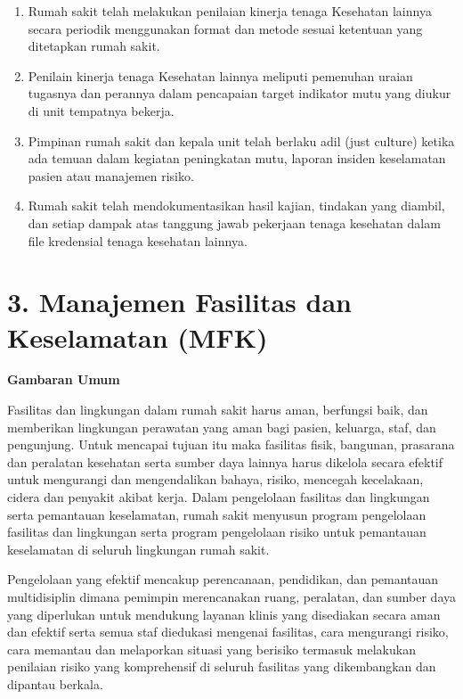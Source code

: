\documentclass[
]{book}
\providecommand{\tightlist}{%
  \setlength{\itemsep}{0pt}\setlength{\parskip}{0pt}}
\begin{document}
\begin{enumerate}
\def\labelenumi{\alph{enumi}.}
\tightlist
\item
  Rumah sakit telah melakukan penilaian kinerja tenaga Kesehatan lainnya secara periodik menggunakan format dan metode sesuai ketentuan yang ditetapkan rumah sakit.
\item
  Penilain kinerja tenaga Kesehatan lainnya meliputi pemenuhan uraian tugasnya dan perannya dalam pencapaian target indikator mutu yang diukur di unit tempatnya bekerja.
\item
  Pimpinan rumah sakit dan kepala unit telah berlaku adil (just culture) ketika ada temuan dalam kegiatan peningkatan mutu, laporan insiden keselamatan pasien atau manajemen risiko.
\item
  Rumah sakit telah mendokumentasikan hasil kajian, tindakan yang diambil, dan setiap dampak atas tanggung jawab pekerjaan tenaga kesehatan dalam file kredensial tenaga kesehatan lainnya.
\end{enumerate}

\hypertarget{manajemen-fasilitas-dan-keselamatan-mfk}{%
\section*{3. Manajemen Fasilitas dan Keselamatan (MFK)}\label{manajemen-fasilitas-dan-keselamatan-mfk}}

\textbf{Gambaran Umum}

Fasilitas dan lingkungan dalam rumah sakit harus aman, berfungsi baik, dan memberikan lingkungan perawatan yang aman bagi pasien, keluarga, staf, dan pengunjung. Untuk mencapai tujuan itu maka fasilitas fisik, bangunan, prasarana dan peralatan kesehatan serta sumber daya lainnya harus dikelola secara efektif untuk mengurangi dan mengendalikan bahaya, risiko, mencegah kecelakaan, cidera dan penyakit akibat kerja. Dalam pengelolaan fasilitas dan lingkungan serta pemantauan keselamatan, rumah sakit menyusun program pengelolaan fasilitas dan lingkungan serta program pengelolaan risiko untuk pemantauan keselamatan di seluruh lingkungan rumah sakit.

Pengelolaan yang efektif mencakup perencanaan, pendidikan, dan pemantauan multidisiplin dimana pemimpin merencanakan ruang, peralatan, dan sumber daya yang diperlukan untuk mendukung layanan klinis yang disediakan secara aman dan efektif serta semua staf diedukasi mengenai fasilitas, cara mengurangi risiko, cara memantau dan melaporkan situasi yang berisiko termasuk melakukan penilaian risiko yang komprehensif di seluruh fasilitas yang dikembangkan dan dipantau berkala.
\end{document}
